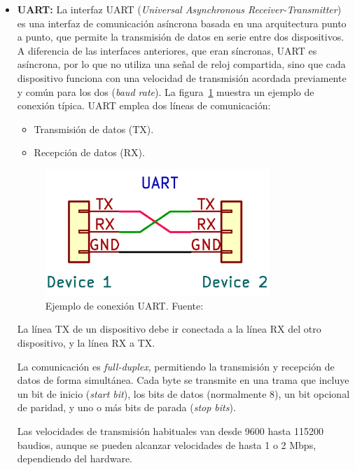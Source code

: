\begin{itemize}
    La comunicación se inicia cuando el primario envía una condición de inicio, la dirección de uno de los dispositivos conectados al bus y un bit indicando si va a leer o escribir.
    Después de transmitir cada byte, el receptor envía una señal de reconocimiento (ACK). La transmisión termina cuando se envía una condición de parada.

    El bus I²C permite velocidades de transferencia de hasta 100 kbit/s en modo estándar (\emph{Standard-mode}), 400 kbit/s en modo rápido (\emph{Fast-mode}), 1 Mbit/s en modo fast-mode plus (Fm+), y hasta 3.4 Mbit/s en modo \emph{high-speed (Hs-mode)}, dependiendo de las capacidades del hardware.

    \item \textbf{UART:} La interfaz UART (\emph{Universal Asynchronous Receiver-Transmitter})~\cite{infineon_uart} es una interfaz de comunicación asíncrona basada en una arquitectura punto a punto,
    que permite la transmisión de datos en serie entre dos dispositivos.
    A diferencia de las interfaces anteriores, que eran síncronas, UART es asíncrona, por lo que no utiliza una señal de reloj compartida,
    sino que cada dispositivo funciona con una velocidad de transmisión acordada previamente y común para los dos (\emph{baud rate}). La figura~\ref{fig:uart} muestra un ejemplo de conexión típica.
    UART emplea dos líneas de comunicación:
    \begin{itemize}
        \item Transmisión de datos (TX).
        \item Recepción de datos (RX).
    \end{itemize}
    \begin{figure}[h]
        \centering
        \includegraphics[width=0.8\textwidth]{Imagenes/Bitmap/uart}
        \caption{Ejemplo de conexión UART. Fuente: \cite{secureideas_uart}}
        \label{fig:uart}
    \end{figure}
    La línea TX de un dispositivo debe ir conectada a la línea RX del otro dispositivo, y la línea RX a TX.

    La comunicación es \emph{full-duplex}, permitiendo la transmisión y recepción de datos de forma simultánea.
    Cada byte se transmite en una trama que incluye un bit de inicio (\emph{start bit}), los bits de datos (normalmente 8), un bit opcional de paridad, y uno o más bits de parada (\emph{stop bits}).

    Las velocidades de transmisión habituales van desde 9600 hasta 115200 baudios, aunque se pueden alcanzar velocidades de hasta 1 o 2 Mbps, dependiendo del hardware.

\end{itemize}
